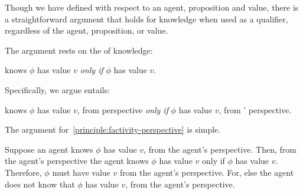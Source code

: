 \begin{note}[Knowledge]
  Though we have defined \ptivity{} with respect to an agent, proposition and value, there is a straightforward argument that \ptivity{} holds for knowledge when used as a qualifier, regardless of the agent, proposition, or value.

  The argument rests on the \factivity{} of knowledge:

  \begin{principle}
    \label{principle:factivity}
    \vAgent{} knows \(\phi\) has value \(v\) \emph{only if} \(\phi\) has value \(v\).
  \end{principle}

  Specifically, we argue \factivity{} entails:

  \begin{principle}
    \label{principle:factivity-perspective}
    \vAgent{} knows \(\phi\) has value \(v\), from \vAgent{} perspective \emph{only if} \(\phi\) has value \(v\), from \vAgent{}' perspective.
  \end{principle}
\end{note}

\begin{note}[Argument]
  The argument for~\autoref{principle:factivity-perspective} is simple.

  Suppose an agent knows \(\phi\) has value \(v\), from the agent's perspective.
  Then, from the agent's perspective the agent knows \(\phi\) has value \(v\) only if \(\phi\) has value \(v\).
  Therefore, \(\phi\) must have value \(v\) from the agent's perspective.
  For, else the agent does not know that \(\phi\) has value \(v\), from the agent's perspective.
\end{note}

